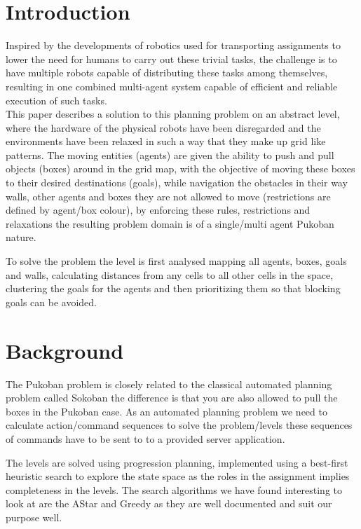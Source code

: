 \documentclass[letterpaper]{article}
\begin{document}
\section{Introduction}
	Inspired by the developments of robotics used for transporting assignments to lower the need for humans to carry out these trivial tasks, the challenge is to have multiple robots capable of distributing these tasks among themselves, resulting in one combined multi-agent system capable of efficient and reliable execution of such tasks.\\
	This paper describes a solution to this planning problem on an abstract level, where the hardware of the physical robots have been disregarded and the environments have been relaxed in such a way that they make up grid like patterns. The  moving entities (agents) are given the ability to push and pull objects (boxes) around in the grid map, with the objective of moving these boxes to their desired destinations (goals), while navigation the obstacles in their way walls, other agents and boxes they are not allowed to move (restrictions are defined by agent/box colour), by enforcing these rules, restrictions and relaxations the resulting problem domain is of a single/multi agent Pukoban nature. 
	
	To solve the problem the level is first analysed mapping all agents, boxes, goals and walls, calculating distances from any cells to all other cells in the space, clustering the goals for the agents and then prioritizing them so that blocking goals can be avoided.\\

\section{Background}
	The Pukoban problem is closely related to the classical automated planning problem called Sokoban the difference is that you are also allowed to pull the boxes in the Pukoban case. As an automated planning problem we need to calculate action/command sequences to solve the problem/levels these sequences of commands have to be sent to to a provided server application.
	
	The levels are solved using progression planning, implemented using a best-first heuristic search to explore the state space as the roles in the assignment implies completeness in the levels. The search algorithms we have found interesting to look at are the AStar and Greedy as they are well documented and suit our purpose well.
\end{document}
